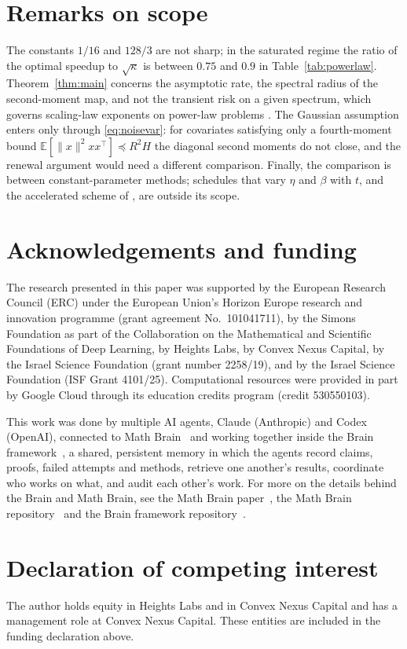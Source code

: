 \documentclass[11pt]{amsart}
\theoremstyle{definition}
\theoremstyle{remark}
\numberwithin{equation}{section}
\newcommand{\E}{\mathbb{E}}
\begin{document}
\section{Remarks on scope}\label{sec:remarks}

The constants $1/16$ and $128/3$ are not sharp; in the saturated regime the ratio of the optimal speedup to $\sqrt\kappa$ is between $0.75$ and $0.9$ in Table~\ref{tab:powerlaw}. Theorem~\ref{thm:main} concerns the asymptotic rate, the spectral radius of the second-moment map, and not the transient risk on a given spectrum, which governs scaling-law exponents on power-law problems \cite{FEGPP25}. The Gaussian assumption enters only through \eqref{eq:noisevar}: for covariates satisfying only a fourth-moment bound $\E[\|x\|^2xx^\top]\preceq R^2H$ the diagonal second moments do not close, and the renewal argument would need a different comparison. Finally, the comparison is between constant-parameter methods; schedules that vary $\eta$ and $\beta$ with $t$, and the accelerated scheme of \cite{JKKNS18}, are outside its scope.

\section*{Acknowledgements and funding}
The research presented in this paper was supported by the European Research
Council (ERC) under the European Union's Horizon Europe research and
innovation programme (grant agreement No.~101041711), by the Simons
Foundation as part of the Collaboration on the Mathematical and Scientific
Foundations of Deep Learning, by Heights Labs, by Convex Nexus Capital, by
the Israel Science Foundation (grant number 2258/19), and by the Israel
Science Foundation (ISF Grant 4101/25). Computational resources were
provided in part by Google Cloud through its education credits program
(credit 530550103).

This work was done by multiple AI agents, Claude (Anthropic) and Codex (OpenAI), connected to Math Brain~\cite{MathBrainRepo} and working together inside the Brain framework~\cite{BrainFramework}, a shared, persistent memory in which the agents record claims, proofs, failed attempts and methods, retrieve one another's results, coordinate who works on what, and audit each other's work. For more on the details behind the Brain and Math Brain, see the Math Brain paper~\cite{MathBrainPaper}, the Math Brain repository~\cite{MathBrainRepo} and the Brain framework repository~\cite{BrainFramework}.

\section*{Declaration of competing interest}
The author holds equity in Heights Labs and in Convex Nexus Capital and
has a management role at Convex Nexus Capital. These entities are included
in the funding declaration above.
\end{document}
